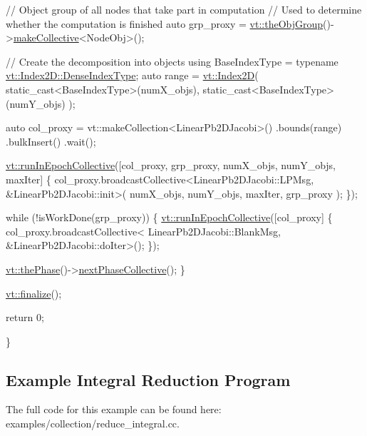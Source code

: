 \begin{DoxyCodeInclude}
  \textcolor{comment}{// Object group of all nodes that take part in computation}
  \textcolor{comment}{// Used to determine whether the computation is finished}
  \textcolor{keyword}{auto} grp\_proxy = \hyperlink{namespacevt_a833f0115b692f578167cbd88e30d39c5}{vt::theObjGroup}()->\hyperlink{structvt_1_1objgroup_1_1_obj_group_manager_a651c44a47c6bcdc9f1b6c9e857fa03f2}{makeCollective}<NodeObj>();

  \textcolor{comment}{// Create the decomposition into objects}
  \textcolor{keyword}{using} BaseIndexType = \textcolor{keyword}{typename} \hyperlink{structvt_1_1index_1_1_dense_index_array_a36698427e28045290d1fb072573275ec}{vt::Index2D::DenseIndexType};
  \textcolor{keyword}{auto} range = \hyperlink{namespacevt_a3bab786053b74a3d856fff1412ffa73a}{vt::Index2D}(
    static\_cast<BaseIndexType>(numX\_objs),
    static\_cast<BaseIndexType>(numY\_objs)
  );

  \textcolor{keyword}{auto} col\_proxy = vt::makeCollection<LinearPb2DJacobi>()
    .bounds(range)
    .bulkInsert()
    .wait();

  \hyperlink{namespacevt_a2fc4ef34f30b49a1781d765804bfadbb}{vt::runInEpochCollective}([col\_proxy, grp\_proxy, numX\_objs, numY\_objs, maxIter] \{
    col\_proxy.broadcastCollective<LinearPb2DJacobi::LPMsg, &LinearPb2DJacobi::init>(
      numX\_objs, numY\_objs, maxIter, grp\_proxy
    );
  \});

  \textcolor{keywordflow}{while} (!isWorkDone(grp\_proxy)) \{
    \hyperlink{namespacevt_a2fc4ef34f30b49a1781d765804bfadbb}{vt::runInEpochCollective}([col\_proxy] \{
      col\_proxy.broadcastCollective<
        LinearPb2DJacobi::BlankMsg, &LinearPb2DJacobi::doIter>();
    \});

    \hyperlink{namespacevt_a3799d6b51fb71d7b6505760aad457e61}{vt::thePhase}()->\hyperlink{structvt_1_1phase_1_1_phase_manager_ac94bfde4a103cbdec426542191c41092}{nextPhaseCollective}();
  \}

  \hyperlink{namespacevt_a540d90dbd6e97b69f1dcbc9ee9314cff}{vt::finalize}();

  \textcolor{keywordflow}{return} 0;

\}
\end{DoxyCodeInclude}
\hypertarget{reduce-integral-example}{}\subsection{Example Integral Reduction Program}\label{reduce-integral-example}
The full code for this example can be found here\+: {\ttfamily examples/collection/reduce\+\_\+integral.\+cc}.


